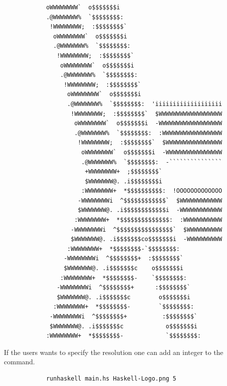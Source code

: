 \documentclass[12pt, a4paper]{article}
\begin{document}
	\begin{scriptsize}
    	\begin{verbatim}
			oWWWWWWWW`  o$$$$$$$i                             
			.@WWWWWWW%  `$$$$$$$$:                            
			 !WWWWWWWW;  :$$$$$$$$`                           
			  oWWWWWWWW`  o$$$$$$$i                           
			  .@WWWWWWW%  `$$$$$$$$:                          
			   !WWWWWWWW;  :$$$$$$$$`                         
			    oWWWWWWWW`  o$$$$$$$i                         
			    .@WWWWWWW%  `$$$$$$$$:                        
			     !WWWWWWWW;  :$$$$$$$$`                       
			      oWWWWWWWW`  o$$$$$$$i                       
			      .@WWWWWWW%  `$$$$$$$$:  'iiiiiiiiiiiiiiiiiii
			       !WWWWWWWW;  :$$$$$$$$`  $WWWWWWWWWWWWWWWWWW
			        oWWWWWWWW`  o$$$$$$$i  -WWWWWWWWWWWWWWWWWW
			        .@WWWWWWW%  `$$$$$$$$:  :WWWWWWWWWWWWWWWWW
			         !WWWWWWWW;  :$$$$$$$$`  $WWWWWWWWWWWWWWWW
			          oWWWWWWWW`  o$$$$$$$i  -WWWWWWWWWWWWWWWW
			          .@WWWWWWW%  `$$$$$$$$:  -```````````````
			           +WWWWWWWW+  ;$$$$$$$$`                 
			           $WWWWWWW@. .i$$$$$$$$i                 
			          :WWWWWWWW+  *$$$$$$$$$$:  !OOOOOOOOOOOOO
			         -WWWWWWWWi  ^$$$$$$$$$$$$`  $WWWWWWWWWWWW
			         $WWWWWWW@. .i$$$$$$$$$$$$i  -WWWWWWWWWWWW
			        :WWWWWWWW+  *$$$$$$$$$$$$$$:  :WWWWWWWWWWW
			       -WWWWWWWWi  ^$$$$$$$$$$$$$$$$`  $WWWWWWWWWW
			       $WWWWWWW@. .i$$$$$$$co$$$$$$$i  -WWWWWWWWWW
			      :WWWWWWWW+  *$$$$$$$$-`$$$$$$$$:            
			     -WWWWWWWWi  ^$$$$$$$$+  :$$$$$$$$`           
			     $WWWWWWW@. .i$$$$$$$c    o$$$$$$$i           
			    :WWWWWWWW+  *$$$$$$$$-    `$$$$$$$$:          
			   -WWWWWWWWi  ^$$$$$$$$+      :$$$$$$$$`         
			   $WWWWWWW@. .i$$$$$$$c        o$$$$$$$i         
			  :WWWWWWWW+  *$$$$$$$$-        `$$$$$$$$:        
			 -WWWWWWWWi  ^$$$$$$$$+          :$$$$$$$$`       
			 $WWWWWWW@. .i$$$$$$$c            o$$$$$$$i       
			:WWWWWWWW+  *$$$$$$$$-            `$$$$$$$$:      
    	\end{verbatim}  
	\end{scriptsize} 

	If the users wants to specify the resolution one can add an integer to the command.

	\begin{footnotesize}
		\begin{verbatim}
			runhaskell main.hs Haskell-Logo.png 5
		\end{verbatim}
	\end{footnotesize} 
\end{document}

